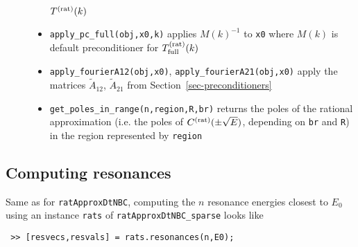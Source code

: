 \begin{description}
\begin{itemize}
          $T^{(\text{rat})}(k)$
    \item {\tt apply\_pc\_full(obj,x0,k)} applies $M(k)^{-1}$ to
          {\tt x0} where $M(k)$ is default preconditioner for
          $T^{(\text{rat})}_{\text{full}}(k)$
    \item {\tt apply\_fourierA12(obj,x0)}, {\tt apply\_fourierA21(obj,x0)} 
          apply the matrices $\tilde{A}_{12}$, $\tilde{A}_{21}$ from
          Section~\ref{sec-preconditioners}
    \item {\tt get\_poles\_in\_range(n,region,R,br)} returns the poles
          of the rational approximation (i.e. the poles of
          $C^{(\text{rat})}(\pm\sqrt{E})$, depending on {\tt br} and {\tt R}) in the region
          represented by {\tt region}
   \end{itemize}
\end{description}

\subsection{Computing resonances}

Same as for {\tt ratApproxDtNBC}, computing the $n$ resonance energies
closest to $E_0$ using an instance {\tt rats} of {\tt ratApproxDtNBC\_sparse}
looks like
\begin{verbatim}
 >> [resvecs,resvals] = rats.resonances(n,E0);
\end{verbatim}
